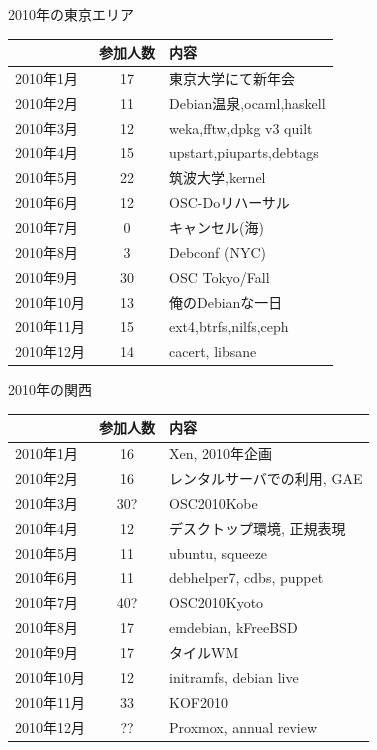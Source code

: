 \begin{frame}{2010年の東京エリア}

 \begin{tabular}{|l|c|p{10em}|}
  \hline
  & 参加人数 & 内容\\
  \hline
  2010年1月 & 17 &  東京大学にて新年会 \\
  2010年2月 & 11 & Debian温泉,ocaml,haskell \\
  2010年3月 & 12 & weka,fftw,dpkg v3 quilt \\
  2010年4月 & 15 & upstart,piuparts,debtags \\
  2010年5月 & 22 & 筑波大学,kernel \\
  2010年6月 & 12 & OSC-Doリハーサル  \\
  2010年7月 & 0 & キャンセル(海)  \\
  2010年8月 & 3 & Debconf (NYC) \\
  2010年9月 & 30 & OSC Tokyo/Fall \\
  2010年10月 & 13 & 俺のDebianな一日 \\
  2010年11月 & 15 & ext4,btrfs,nilfs,ceph \\
  2010年12月 & 14 &  cacert, libsane \\
  \hline
 \end{tabular}
\end{frame}

\begin{frame}{2010年の関西}
  \begin{tabular}{|l|c|p{10em}|}
 \hline
 & 参加人数 & 内容 \\
 \hline
2010年1月 & 16 & Xen, 2010年企画 \\
2010年2月 & 16 & レンタルサーバでの利用, GAE \\
2010年3月 & 30? & OSC2010Kobe \\
2010年4月 & 12 & デスクトップ環境, 正規表現 \\
2010年5月 & 11 & ubuntu, squeeze \\
2010年6月 & 11 & debhelper7, cdbs, puppet \\
2010年7月 & 40? & OSC2010Kyoto \\
2010年8月 & 17 & emdebian, kFreeBSD \\
2010年9月 & 17 & タイルWM \\
2010年10月 & 12 & initramfs, debian live \\
2010年11月 & 33 & KOF2010 \\
2010年12月 & ?? & Proxmox, annual review \\
 \hline
  \end{tabular}

\end{frame}

